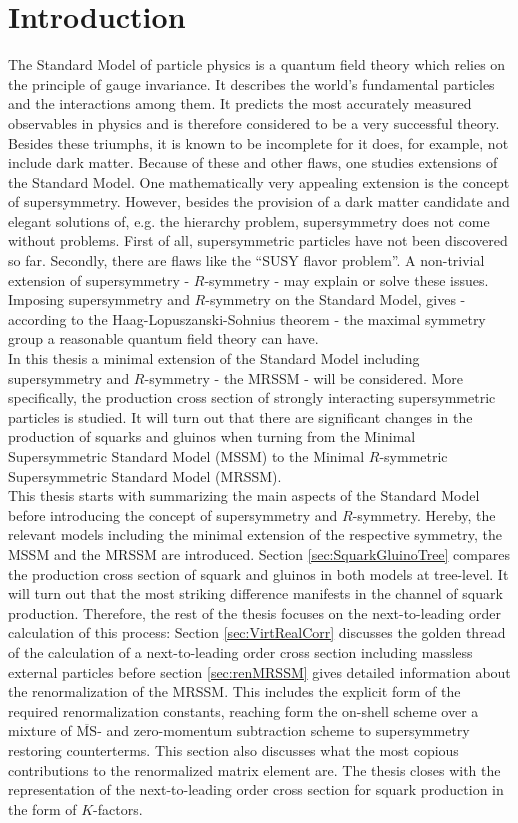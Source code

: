 \section{Introduction}
The Standard Model of particle physics is a quantum field theory which relies on the principle of gauge invariance. It describes the world's fundamental particles and the interactions among them. It predicts the most accurately measured observables in physics and is therefore considered to be a very successful theory.\\
Besides these triumphs, it is known to be incomplete for it does, for example, not include dark matter. Because of these and other flaws, one studies extensions of the Standard Model. One mathematically very appealing extension is the concept of supersymmetry. However, besides the provision of a dark matter candidate and elegant solutions of, e.g. the hierarchy problem, supersymmetry does not come without problems. First of all, supersymmetric particles have not been discovered so far. Secondly, there are flaws like the ``SUSY flavor problem''. A non-trivial extension of supersymmetry - $R$-symmetry - may explain or solve these issues. Imposing supersymmetry and $R$-symmetry on the Standard Model, gives - according to the Haag-Lopuszanski-Sohnius theorem - the maximal symmetry group a reasonable quantum field theory can have.\\
In this thesis a minimal extension of the Standard Model including supersymmetry and $R$-symmetry - the MRSSM - will be considered. More specifically, the production cross section of strongly interacting supersymmetric particles is studied. It will turn out that there are significant changes in the production of squarks and gluinos when turning from the Minimal Supersymmetric Standard Model (MSSM) to the Minimal $R$-symmetric Supersymmetric Standard Model (MRSSM).\\
This thesis starts with summarizing the main aspects of the Standard Model before introducing the concept of supersymmetry and $R$-symmetry. Hereby, the relevant models including the minimal extension of the respective symmetry, the MSSM and the MRSSM are introduced. Section \ref{sec:SquarkGluinoTree} compares the production cross section of squark and gluinos in both models at tree-level. It will turn out that the most striking difference manifests in the channel of squark production. Therefore, the rest of the thesis focuses on the next-to-leading order calculation of this process: Section \ref{sec:VirtRealCorr} discusses the golden thread of the calculation of a next-to-leading order cross section including massless external particles before section \ref{sec:renMRSSM} gives detailed information about the renormalization of the MRSSM. This includes the explicit form of the required renormalization constants, reaching form the on-shell scheme over a mixture of $\overline{\mathrm{MS}}$- and zero-momentum subtraction scheme to supersymmetry restoring counterterms. This section also discusses what the most copious contributions to the renormalized matrix element are. The thesis closes with the representation of the next-to-leading order cross section for squark production in the form of $K$-factors.

